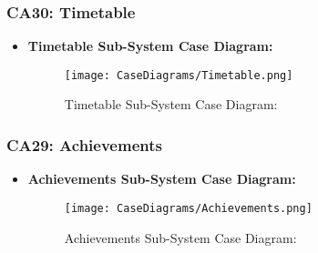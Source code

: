 \documentclass[12pt,a4paper]{article}
\begin{document}
		\subsubsection{CA30: Timetable}
			\begin{itemize}
				\item \textbf{Timetable Sub-System Case Diagram:}
				\begin{figure}[H]
					\texttt{[image: CaseDiagrams/Timetable.png]}
					\caption{Timetable Sub-System Case Diagram:}
				\end{figure}
			\end{itemize}
		\subsubsection{CA29: Achievements}
			\begin{itemize}
				\item \textbf{Achievements Sub-System Case Diagram:}
				\begin{figure}[H]
					\texttt{[image: CaseDiagrams/Achievements.png]}
					\caption{Achievements Sub-System Case Diagram:}
				\end{figure}
			\end{itemize}
\end{document}

